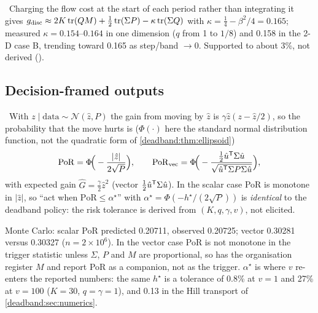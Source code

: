 \begin{conjecture}
\label{deadband:conj:kappa}
\tagConjecture\ Charging the flow cost at the start of each period rather than integrating it gives $g_{\mathrm{disc}} \approx 2K\operatorname{tr}(QM) + \tfrac12\operatorname{tr}(\Sigma P) - \kappa\operatorname{tr}(\Sigma Q)$ with $\kappa = \tfrac14 - \beta^2/4 = 0.165$; measured $\kappa = 0.154$--$0.164$ in one dimension ($q$ from 1 to $1/8$) and 0.158 in the 2-D case B, trending toward 0.165 as step/band $\to 0$. Supported to about 3\%, not derived ().
\end{conjecture}

\subsection{Decision-framed outputs}

\begin{proposition}
\label{deadband:prop:por}
\tagEstablished\ With $z \mid \text{data} \sim \mathcal N(\hat z, P)$ the gain from moving by $\hat z$ is $\gamma\hat z(z - \hat z/2)$, so the probability that the move hurts is ($\Phi(\cdot)$ here the standard normal distribution function, not the quadratic form of \cref{deadband:thm:ellipsoid})
\begin{equation}
\mathrm{PoR} = \Phi\!\Big(-\frac{|\hat z|}{2\sqrt P}\Big), \qquad
\mathrm{PoR}_{\mathrm{vec}} = \Phi\!\Big(-\frac{\tfrac12\hat u^{\mathsf{T}}\Sigma\hat u}{\sqrt{\hat u^{\mathsf{T}}\Sigma P\Sigma\hat u}}\Big),
\label{eq:deadband:por}
\end{equation}
with expected gain $\hat G = \tfrac{\gamma}{2}\hat z^2$ (vector $\tfrac12\hat u^{\mathsf{T}}\Sigma\hat u$). In the scalar case PoR is monotone in $|\hat z|$, so ``act when $\mathrm{PoR} \le \alpha^\star$'' with $\alpha^\star = \Phi(-h^\star/(2\sqrt P))$ is \emph{identical} to the deadband policy: the risk tolerance is derived from $(K, q, \gamma, v)$, not elicited.
\end{proposition}

Monte Carlo: scalar PoR predicted 0.20711, observed 0.20725; vector 0.30281 versus 0.30327 ($n = 2\times10^6$). In the vector case PoR is not monotone in the trigger statistic unless $\Sigma$, $P$ and $M$ are proportional, so  has the organisation register $M$ and report PoR as a companion, not as the trigger. $\alpha^\star$ is where $v$ re-enters the reported numbers: the same $h^\star$ is a tolerance of 0.8\% at $v = 1$ and 27\% at $v = 100$ ($K = 30$, $q = \gamma = 1$), and 0.13 in the Hill transport of \cref{deadband:sec:numerics}.

